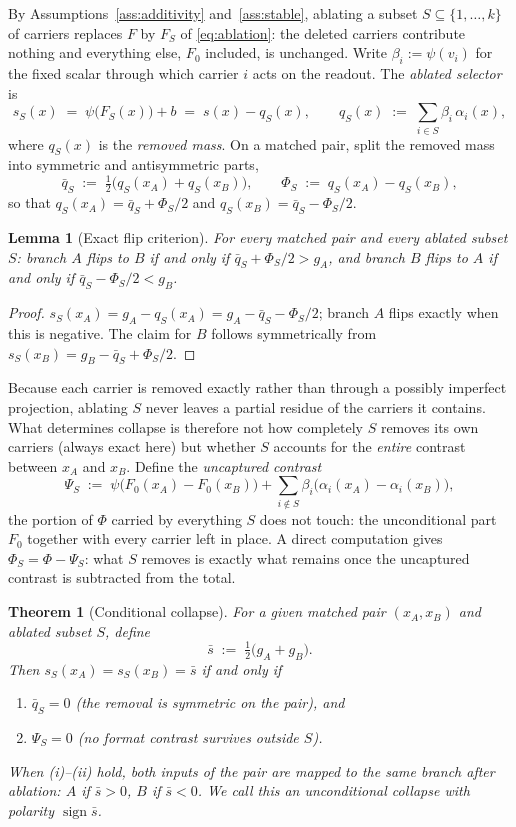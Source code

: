\documentclass[11pt,a4paper]{article}
\newtheorem{theorem}{Theorem}
\newtheorem{lemma}{Lemma}
\begin{document}
By Assumptions~\ref{ass:additivity} and~\ref{ass:stable}, ablating a subset
$S\subseteq\{1,\dots,k\}$ of carriers replaces $F$ by $F_S$ of
\eqref{eq:ablation}: the deleted carriers contribute nothing and everything
else, $F_0$ included, is unchanged. Write $\beta_i:=\psi(v_i)$ for the fixed
scalar through which carrier $i$ acts on the readout. The \emph{ablated
selector} is
\[
s_S(x) \;=\; \psi\bigl(F_S(x)\bigr)+b \;=\; s(x)-q_S(x),
\qquad
q_S(x) \;:=\; \sum_{i\in S}\beta_i\,\alpha_i(x),
\]
where $q_S(x)$ is the \emph{removed mass}. On a matched pair, split the removed
mass into symmetric and antisymmetric parts,
\[
\bar q_S \;:=\; \tfrac12\bigl(q_S(x_A)+q_S(x_B)\bigr),
\qquad
\Phi_S \;:=\; q_S(x_A)-q_S(x_B),
\]
so that $q_S(x_A)=\bar q_S+\Phi_S/2$ and $q_S(x_B)=\bar q_S-\Phi_S/2$.

\begin{lemma}[Exact flip criterion]
\label{lem:flip}
For every matched pair and every ablated subset $S$: branch $A$ flips to $B$
if and only if $\bar q_S+\Phi_S/2 > g_A$, and branch $B$ flips to $A$ if
and only if $\bar q_S-\Phi_S/2 < g_B$.
\end{lemma}

\begin{proof}
$s_S(x_A)=g_A-q_S(x_A)=g_A-\bar q_S-\Phi_S/2$; branch $A$ flips exactly
when this is negative. The claim for $B$ follows symmetrically from
$s_S(x_B)=g_B-\bar q_S+\Phi_S/2$.
\end{proof}

Because each carrier is removed exactly rather than through a possibly
imperfect projection, ablating $S$ never leaves a partial residue of the
carriers it contains. What determines collapse is therefore not how
completely $S$ removes its own carriers (always exact here) but
whether $S$ accounts for the \emph{entire} contrast between $x_A$ and $x_B$.
Define the \emph{uncaptured contrast}
\[
\Psi_S \;:=\; \psi\bigl(F_0(x_A)-F_0(x_B)\bigr)
+ \sum_{i\notin S}\beta_i\bigl(\alpha_i(x_A)-\alpha_i(x_B)\bigr),
\]
the portion of $\Phi$ carried by everything $S$ does not touch: the
unconditional part $F_0$ together with every carrier left in place. A direct
computation gives $\Phi_S=\Phi-\Psi_S$: what $S$ removes is exactly
what remains once the uncaptured contrast is subtracted from the total.

\begin{theorem}[Conditional collapse]
\label{thm:collapse}
For a given matched pair $(x_A,x_B)$ and ablated subset $S$, define
\[
\bar s \;:=\; \tfrac12\bigl(g_A+g_B\bigr).
\]
Then $s_S(x_A)=s_S(x_B)=\bar s$ \textup{if and only if}
\begin{enumerate}
\item[(i)] $\bar q_S=0$ \textup{(the removal is symmetric on the pair)}, and
\item[(ii)] $\Psi_S=0$ \textup{(no format contrast survives outside $S$)}.
\end{enumerate}
When (i)--(ii) hold, both inputs of the pair are mapped to the same branch
after ablation: $A$ if $\bar s>0$, $B$ if $\bar s<0$. We call this an
\emph{unconditional collapse} with \emph{polarity}
$\operatorname{sign}\bar s$.
\end{theorem}
\end{document}
